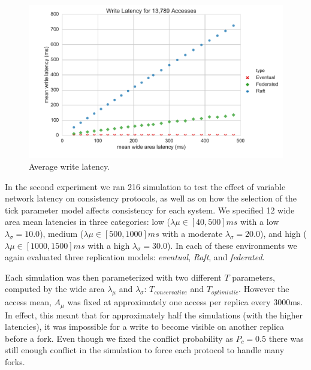 \documentclass[10pt,conference,letterpaper]{IEEEtran}
\begin{document}
\begin{figure}[t]
    \centering
      \includegraphics[width=\linewidth]{figures/latency/write_latency}
      \caption{Average write latency.}\label{fig:write_latency}
    \endminipage\hfill
\end{figure}

In the second experiment we ran 216 simulation to test the effect of variable network
latency on consistency protocols, as well as on how the selection of the tick parameter
model affects consistency for each system.
We specified 12 wide area mean latencies in three categories: low ($\lambda{\mu} \in
[40,500]ms$ with a low $\lambda_{\sigma}=10.0$), medium ($\lambda{\mu} \in [500,1000]ms$
with a moderate $\lambda_{\sigma}=20.0$), and high ($\lambda{\mu} \in [1000,1500]ms$ with
a high $\lambda_{\sigma}=30.0$).
In each of these environments we again evaluated three replication models:
\textit{eventual}, \textit{Raft}, and \textit{federated}.

Each simulation was then parameterized with two different $T$ parameters, computed by the
wide area $\lambda_{\mu}$ and $\lambda_{\sigma}$: $T_{conservative}$ and $T_{optimistic}$.
However the access mean, $A_{\mu}$ was fixed at approximately one access per replica every
3000ms.
In effect, this meant that for approximately half the simulations (with the higher
latencies), it was impossible for a write to become visible on another replica before a
fork.
Even though we fixed the conflict probability as $P_c=0.5$ there was still enough conflict
in the simulation to force each protocol to handle many forks.
\end{document}
